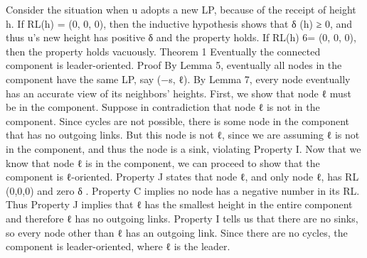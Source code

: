 Consider the situation when u adopts a new LP, because of the receipt of height h. If RL(h) = (0, 0, 0), then the inductive hypothesis shows that δ (h) ≥ 0, and thus u’s new height has positive δ and the property holds. If RL(h) 6= (0, 0, 0), then the property holds vacuously. Theorem 1 Eventually the connected component is leader-oriented.
Proof By Lemma 5, eventually all nodes in the component have the same LP, say (−s, ℓ). By Lemma 7, every node eventually has an accurate view of its neighbors’ heights. First, we show that node ℓ must be in the component. Suppose in contradiction that node ℓ is not in the component. Since cycles are not possible, there is some node in the component that has no outgoing links. But this node is not ℓ, since we are assuming ℓ is not in the component, and thus the node is a sink, violating Property I. Now that we know that node ℓ is in the component, we can proceed to show that the component is ℓ-oriented. Property J states that node ℓ, and only node ℓ, has RL (0,0,0) and zero δ . Property C implies no node has a negative number in its RL. Thus Property J implies that ℓ has the smallest height in the entire component and therefore ℓ has no outgoing links. Property I tells us that there are no sinks, so every node other than ℓ has an outgoing link. Since there are no cycles, the component is leader-oriented, where ℓ is the leader.